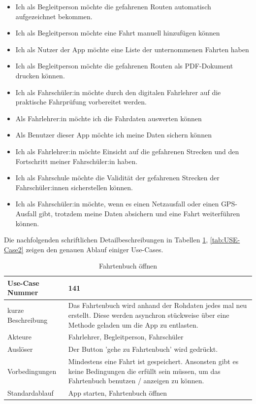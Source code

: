 \begin{itemize}
	\item Ich als Begleitperson möchte die gefahrenen Routen automatisch aufgezeichnet bekommen.
	\item Ich als Begleitperson möchte eine Fahrt manuell hinzufügen können
	\item Ich als Nutzer der App möchte eine Liste der unternommenen Fahrten haben
	\item Ich als Begleitperson möchte die gefahrenen Routen als PDF-Dokument drucken können.
	\item Ich als Fahrschüler:in möchte durch den digitalen Fahrlehrer auf die praktische Fahrprüfung vorbereitet werden.
	\item Als Fahrlehrer:in möchte ich die Fahrdaten auswerten können
	\item Als Benutzer dieser App möchte ich meine Daten sichern können
	\item Ich als Fahrlehrer:in möchte Einsicht auf die gefahrenen Strecken und den Fortschritt meiner Fahrschüler:in haben.
	\item Ich als Fahrschule möchte die Validität der gefahrenen Strecken der Fahrschüler:innen sicherstellen können.
	\item Ich als Fahrschüler:in möchte, wenn es einen Netzausfall oder einen GPS-Ausfall gibt, trotzdem meine Daten absichern und eine Fahrt weiterführen können.
\end{itemize}

Die nachfolgenden schriftlichen Detailbeschreibungen in Tabellen \ref{tab:USE-Case1}, \ref{tab:USE-Case2} zeigen den genauen Ablauf einiger Use-Cases.
\begin{table}[H]
	\centering
	\begin{tabularx}{\textwidth}{|l|X|}
		\hline
		Use-Case Nummer & 141 \\
		\hline
		kurze Beschreibung & Das Fahrtenbuch wird anhand der Rohdaten jedes mal neu erstellt. Diese werden asynchron stückweise über eine Methode geladen um die App zu entlasten.   \\
		\hline
		Akteure &  Fahrlehrer, Begleitperson, Fahrschüler\\
		\hline
		Auslöser & Der Button 'gehe zu Fahrtenbuch' wird gedrückt. \\
		\hline
		Vorbedingungen & Mindestens eine Fahrt ist gespeichert. Ansonsten gibt es keine Bedingungen die erfüllt sein müssen, um das Fahrtenbuch benutzen / anzeigen zu können. \\
		\hline
		Standardablauf & App starten, Fahrtenbuch öffnen \\
		\hline
	\end{tabularx}
	\caption{Fahrtenbuch öffnen}
	\label{tab:USE-Case1}
\end{table}

